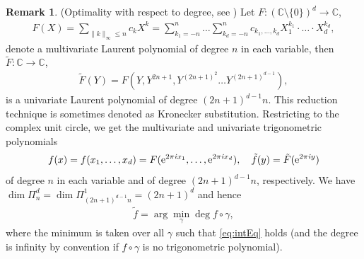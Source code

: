 \documentclass[11pt,a4paper,twoside,final,biblatex]{scrartcl}
\newcommand{\C}{\ensuremath{\mathbb{C}}}
\newcommand{\ii}{\mathit{i}}
\newcommand{\eip}[1]{\textnormal{e}^{2\pi\ii{#1}}}
\theoremstyle{definition}
\newtheorem{remark}[theorem]{Remark}
\numberwithin{equation}{section}
\numberwithin{table}{section}
\numberwithin{figure}{section}
\begin{document}
\begin{remark}(Optimality with respect to degree, see \cite[Thm.~2]{BoDeVi17})
Let $F\colon\left(\C\setminus\{0\}\right)^d\to\C$,
\begin{align*}
 F(X)=\sum_{\|k\|_\infty\le n} c_k X^k=\sum_{k_1=-n}^n\dots\sum_{k_d=-n}^n c_{k_1,\hdots,k_d} X_1^{k_1}\cdot\hdots\cdot X_d^{k_d},
\end{align*}
denote a multivariate Laurent polynomial of degree $n$ in each variable, then $\tilde F\colon\C\to\C$,
\begin{align*}
 \tilde F(Y)=F\left(Y,Y^{2n+1},Y^{(2n+1)^2}\hdots Y^{(2n+1)^{d-1}}\right),
\end{align*}
is a univariate Laurent polynomial of degree $(2n+1)^{d-1} n$.
This reduction technique is sometimes denoted as Kronecker substitution.
Restricting to the complex unit circle, we get the multivariate and univariate trigonometric polynomials
\begin{align*}
 f(x)=f(x_1,\hdots,x_d)=F(\eip{x_1},\hdots,\eip{x_d}), \quad
 \tilde f(y)=\tilde F(\eip{y})
\end{align*}
of degree $n$ in each variable and of degree $(2n+1)^{d-1} n$, respectively.
We have $\dim \Pi_n^d=\dim \Pi_{(2n+1)^{d-1}n}^1=(2n+1)^d$ and hence 
\begin{align*}
    \tilde f=\arg\min_{\gamma} \deg f\circ \gamma,
\end{align*}
where the minimum is taken over all $\gamma$ such that \eqref{eq:intEq} holds (and the degree is infinity by convention if $f\circ\gamma$ is no trigonometric polynomial).
\end{remark}
\end{document}
